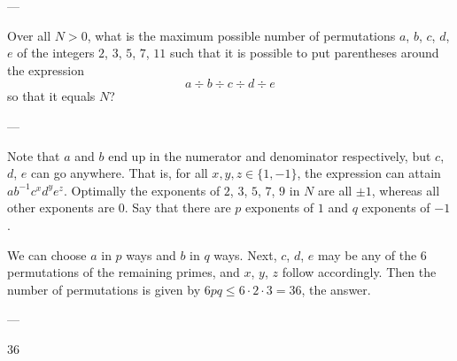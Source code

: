 
---

Over all $N>0$, what is the maximum possible number of permutations $a$, $b$, $c$, $d$, $e$ of the integers $2$, $3$, $5$, $7$, $11$ such that it is possible to put parentheses around the expression\[a\div b\div c\div d\div e\]
so that it equals $N$?

---

Note that $a$ and $b$ end up in the numerator and denominator respectively, but $c$, $d$, $e$ can go anywhere. That is, for all $x,y,z\in\{1,-1\}$, the expression can attain $ab^{-1}c^xd^ye^z$. Optimally the exponents of $2$, $3$, $5$, $7$, $9$ in $N$ are all $\pm1$, whereas all other exponents are $0$. Say that there are $p$ exponents of $1$ and $q$ exponents of $-1$.

We can choose $a$ in $p$ ways and $b$ in $q$ ways. Next, $c$, $d$, $e$ may be any of the $6$ permutations of the remaining primes, and $x$, $y$, $z$ follow accordingly. Then the number of permutations is given by $6pq\le6\cdot2\cdot3=36$, the answer.

---

36
